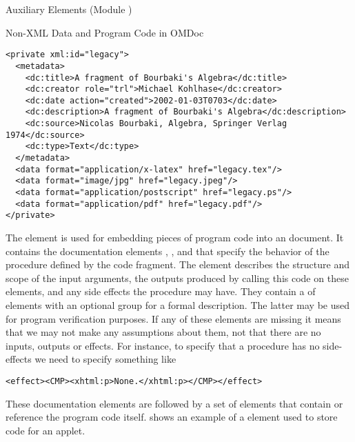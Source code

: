 \begin{tchapter}[id=ext,short=Auxiliary Elements]{Auxiliary Elements (Module {})}
\begin{tsection}[id=private]{Non-XML Data and Program Code in OMDoc}
\begin{lstlisting}[label=lst:private-fig,index={private,data},
  caption={A {\element{private}} Element for an Image}]
<private xml:id="legacy">
  <metadata>
    <dc:title>A fragment of Bourbaki's Algebra</dc:title>
    <dc:creator role="trl">Michael Kohlhase</dc:creator> 
    <dc:date action="created">2002-01-03T0703</dc:date>
    <dc:description>A fragment of Bourbaki's Algebra</dc:description>
    <dc:source>Nicolas Bourbaki, Algebra, Springer Verlag 1974</dc:source>
    <dc:type>Text</dc:type>
  </metadata>
  <data format="application/x-latex" href="legacy.tex"/>
  <data format="image/jpg" href="legacy.jpeg"/>
  <data format="application/postscript" href="legacy.ps"/>
  <data format="application/pdf" href="legacy.pdf"/>
</private>
\end{lstlisting}

The {} element is used for embedding pieces of program code into an {\omdoc}
document.  It contains the documentation elements {}, {}, and
{} that specify the behavior of the procedure defined by the code fragment.
The {} element describes the structure and scope of the input arguments,
{} the outputs produced by calling this code on these elements, and
{} any side effects the procedure may have.  They contain a
{} of {} elements with an optional
{} group for a formal description. The latter may be used for program
verification purposes. If any of these elements are missing it means that we may not make
any assumptions about them, not that there are no inputs, outputs or effects. For
instance, to specify that a procedure has no side-effects we need to specify something
like 
\begin{lstlisting}
<effect><CMP><xhtml:p>None.</xhtml:p></CMP></effect>
\end{lstlisting}

These documentation elements are followed by a set of {} elements
that contain or reference the program code itself. {} shows an
example of a {} element used to store {} code for an
applet.


\end{tsection}
\end{tchapter}
